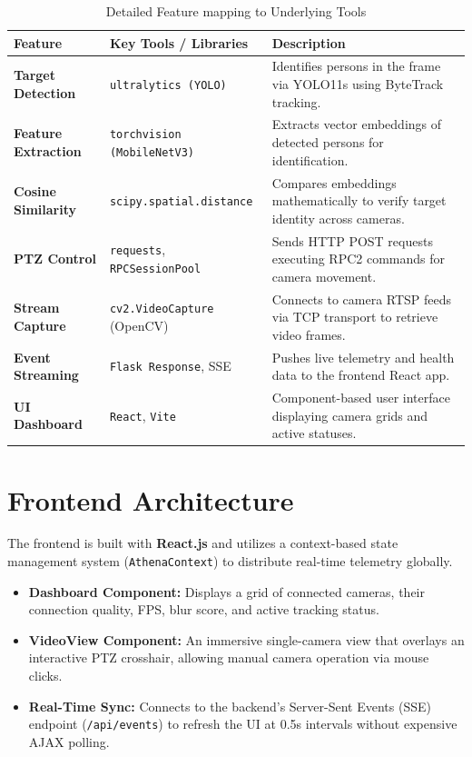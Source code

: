 \documentclass{article}
\begin{document}
\begin{table}[H]
    \centering
    \begin{tabularx}{\textwidth}{l|l|X}
        \toprule
        \textbf{Feature} & \textbf{Key Tools / Libraries} & \textbf{Description} \\
        \midrule
        \textbf{Target Detection} & \texttt{ultralytics (YOLO)} & Identifies persons in the frame via YOLO11s using ByteTrack tracking. \\
        \midrule
        \textbf{Feature Extraction} & \texttt{torchvision (MobileNetV3)} & Extracts vector embeddings of detected persons for identification. \\
        \midrule
        \textbf{Cosine Similarity} & \texttt{scipy.spatial.distance} & Compares embeddings mathematically to verify target identity across cameras. \\
        \midrule
        \textbf{PTZ Control} & \texttt{requests}, \texttt{RPCSessionPool} & Sends HTTP POST requests executing RPC2 commands for camera movement. \\
        \midrule
        \textbf{Stream Capture} & \texttt{cv2.VideoCapture} (OpenCV) & Connects to camera RTSP feeds via TCP transport to retrieve video frames. \\
        \midrule
        \textbf{Event Streaming} & \texttt{Flask Response}, SSE & Pushes live telemetry and health data to the frontend React app. \\
        \midrule
        \textbf{UI Dashboard} & \texttt{React}, \texttt{Vite} & Component-based user interface displaying camera grids and active statuses. \\
        \bottomrule
    \end{tabularx}
    \caption{Detailed Feature mapping to Underlying Tools}
\end{table}

\section{Frontend Architecture}
The frontend is built with \textbf{React.js} and utilizes a context-based state management system (\texttt{AthenaContext}) to distribute real-time telemetry globally.
\begin{itemize}
    \item \textbf{Dashboard Component:} Displays a grid of connected cameras, their connection quality, FPS, blur score, and active tracking status.
    \item \textbf{VideoView Component:} An immersive single-camera view that overlays an interactive PTZ crosshair, allowing manual camera operation via mouse clicks.
    \item \textbf{Real-Time Sync:} Connects to the backend's Server-Sent Events (SSE) endpoint (\texttt{/api/events}) to refresh the UI at 0.5s intervals without expensive AJAX polling.
\end{itemize}
\end{document}
